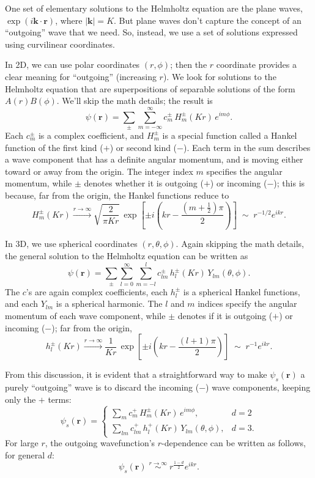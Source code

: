 \documentclass[pra,11pt]{revtex4}
\begin{document}
One set of elementary solutions to the Helmholtz equation are the
plane waves, $\exp(i\mathbf{k}\cdot\mathbf{r})$, where $|\mathbf{k}| =
K$.  But plane waves don't capture the concept of an ``outgoing'' wave
that we need.  So, instead, we use a set of solutions expressed using
curvilinear coordinates.

In 2D, we can use polar coordinates $(r,\phi)$; then the $r$
coordinate provides a clear meaning for ``outgoing'' (increasing $r$).
We look for solutions to the Helmholtz equation that are
superpositions of separable solutions of the form $A(r)B(\phi)$.
We'll skip the math details; the result is
$$\psi(\mathbf{r})=\sum_{\pm}\sum_{m=-\infty}^\infty c_m^\pm\,H_m^\pm(Kr)\,e^{im\phi}.$$
Each $c_m^\pm$ is a complex coefficient, and $H_m^\pm$ is a special
function called a Hankel function of the first kind ($+$) or second
kind ($-$).  Each term in the sum describes a wave component that has a
definite angular momentum, and is moving either toward or away from the
origin.  The integer index $m$ specifies the angular momentum, while
$\pm$ denotes whether it is outgoing ($+$) or incoming ($-$); this is
because, far from the origin, the Hankel functions reduce to
$$H_m^\pm(Kr) \overset{r\rightarrow\infty}{\longrightarrow} \sqrt{\frac{2}{\pi Kr}} \, \exp\left[\pm i\left(kr - \frac{(m+\frac{1}{2})\pi}{2}\right)\right] \;\sim\; r^{-1/2} e^{ikr}.$$

In 3D, we use spherical coordinates $(r,\theta,\phi)$.  Again skipping
the math details, the general solution to the Helmholtz equation can
be written as
$$\psi(\mathbf{r})=\sum_{\pm}\sum_{l=0}^\infty\sum_{m=-l}^lc_{lm}^\pm\,h_l^\pm(Kr)\,Y_{lm}(\theta,\phi).$$
The $c$'s are again complex coefficients, each $h_l^\pm$ is a
spherical Hankel functions, and each $Y_{lm}$ is a spherical harmonic.
The $l$ and $m$ indices specify the angular momentum of each wave
component, while $\pm$ denotes if it is outgoing ($+$) or incoming
($-$); far from the origin,
$$h_l^\pm(Kr) \overset{r\rightarrow\infty}{\longrightarrow} \frac{1}{Kr}\,\exp\left[\pm i\left(kr-\frac{(l+1)\pi}{2}\right)\right] \;\sim\; r^{-1} e^{ikr}.$$

From this discussion, it is evident that a straightforward way to make
$\psi_s(\mathbf{r})$ a purely ``outgoing'' wave is to discard the
incoming ($-$) wave components, keeping only the $+$ terms:
$$\psi_s(\mathbf{r}) = \begin{cases} \displaystyle\sum_{m} c_m^+\,H_m^\pm(Kr)\,e^{im\phi}, &d=2\\ \displaystyle\sum_{lm} c_{lm}^+\,h_l^+(Kr)\,Y_{lm}(\theta,\phi),&d=3.\end{cases}$$
For large $r$, the outgoing wavefunction's $r$-dependence can be
written as follows, for general $d$:
$$\psi_s(\mathbf{r}) \; \overset{r\rightarrow\infty}{\sim} \; r^{\frac{1-d}{2}} e^{ikr}.$$
\end{document}
